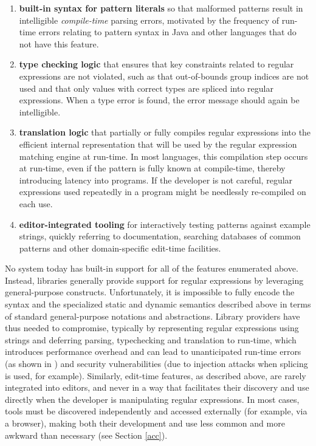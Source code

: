 \begin{enumerate}
\item \textbf{built-in syntax for pattern literals} so that malformed patterns result in intelligible \emph{compile-time} parsing errors, motivated by the frequency of run-time errors relating to pattern syntax in Java \cite{regex-type-system} and other languages that do not have this feature.
\item \textbf{type checking logic} that ensures that key constraints related to regular expressions are not violated, such as that out-of-bounds group indices are not used \cite{regex-type-system} and that only values with correct types are spliced into regular expressions. When a type error is found, the error message should again be intelligible.
\item \textbf{translation logic} that partially or fully compiles regular expressions into the efficient internal representation that will be used by the regular expression matching engine at run-time. In most languages, this compilation step occurs at run-time, even if the pattern is fully known at compile-time, thereby introducing latency into programs. If the developer is not careful, regular expressions used repeatedly in a program might be needlessly re-compiled on each use. %
\item \textbf{editor-integrated tooling} for interactively testing patterns against example strings, quickly referring to documentation, searching databases of common patterns and other domain-specific edit-time facilities.
\end{enumerate}

No system today has built-in support for all of the features enumerated above. Instead, libraries generally provide support for regular expressions by leveraging  general-purpose constructs. Unfortunately, it is impossible to fully encode the syntax and the specialized static and dynamic semantics described above in terms of standard general-purpose notations and abstractions. Library providers have thus needed to compromise, typically by representing regular expressions using strings and deferring parsing, typechecking and translation to run-time, which introduces performance overhead and can lead to unanticipated run-time errors (as shown in \cite{regex-type-system}) and security vulnerabilities (due to injection attacks when splicing is used, for example). Similarly, edit-time features, as described above, are rarely integrated into editors, and never in a way that facilitates their discovery and use directly when the developer is manipulating regular expressions. In most cases, tools must be discovered independently and accessed externally (for example, via a browser), making both their development and use less common and more awkward than necessary \cite{active-code-completion} (see Section \ref{acc}).


